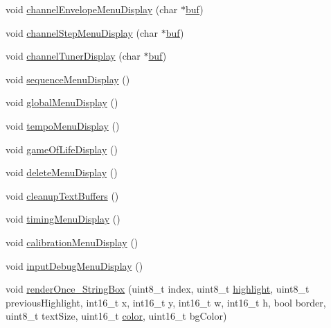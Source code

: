 \begin{DoxyCompactItemize}
\item 
void \hyperlink{class_display_module_a61256f4c2a099fd0b0c59a5bba277914}{channel\+Envelope\+Menu\+Display} (char $\ast$\hyperlink{class_display_module_a07c140067fde1f0cbc4061296179d69a}{buf})
\item 
void \hyperlink{class_display_module_ad5607972b28b5da028dda61cfe640638}{channel\+Step\+Menu\+Display} (char $\ast$\hyperlink{class_display_module_a07c140067fde1f0cbc4061296179d69a}{buf})
\item 
void \hyperlink{class_display_module_a579629d520ad24f721a25b9b1340516b}{channel\+Tuner\+Display} (char $\ast$\hyperlink{class_display_module_a07c140067fde1f0cbc4061296179d69a}{buf})
\item 
void \hyperlink{class_display_module_a3e2fc0a60ef41f41e57d463faf59bd2b}{sequence\+Menu\+Display} ()
\item 
void \hyperlink{class_display_module_a5082cabe11332dc4a9d0daea8a60f9dc}{global\+Menu\+Display} ()
\item 
void \hyperlink{class_display_module_ac5999c2f0f4b1ecc12bafe7094c7b7d2}{tempo\+Menu\+Display} ()
\item 
void \hyperlink{class_display_module_a38006afa64e93afb6c259b137f45bcde}{game\+Of\+Life\+Display} ()
\item 
void \hyperlink{class_display_module_a87e0b873a0f1fcec1bc67f2fa7c9739a}{delete\+Menu\+Display} ()
\item 
void \hyperlink{class_display_module_ab730677e34ecadf39916f9b71c2a41fe}{cleanup\+Text\+Buffers} ()
\item 
void \hyperlink{class_display_module_a722a8c3b1cce1c58fa7e17e2865c3e57}{timing\+Menu\+Display} ()
\item 
void \hyperlink{class_display_module_ae68c2f34985c276b559df3d7f4fafbbd}{calibration\+Menu\+Display} ()
\item 
void \hyperlink{class_display_module_a776e918a0d9f50ae079d6839524cc471}{input\+Debug\+Menu\+Display} ()
\item 
void \hyperlink{class_display_module_a453ceefb9e2a9a82dd7b62825cc2cac8}{render\+Once\+\_\+\+String\+Box} (uint8\+\_\+t index, uint8\+\_\+t \hyperlink{class_display_module_a33ee7436481d6285fb6c81166711fbce}{highlight}, uint8\+\_\+t previous\+Highlight, int16\+\_\+t x, int16\+\_\+t y, int16\+\_\+t w, int16\+\_\+t h, bool border, uint8\+\_\+t text\+Size, uint16\+\_\+t \hyperlink{class_display_module_ac071b7f3b2027d0e90b7d3031d61a99b}{color}, uint16\+\_\+t bg\+Color)
\end{DoxyCompactItemize}
